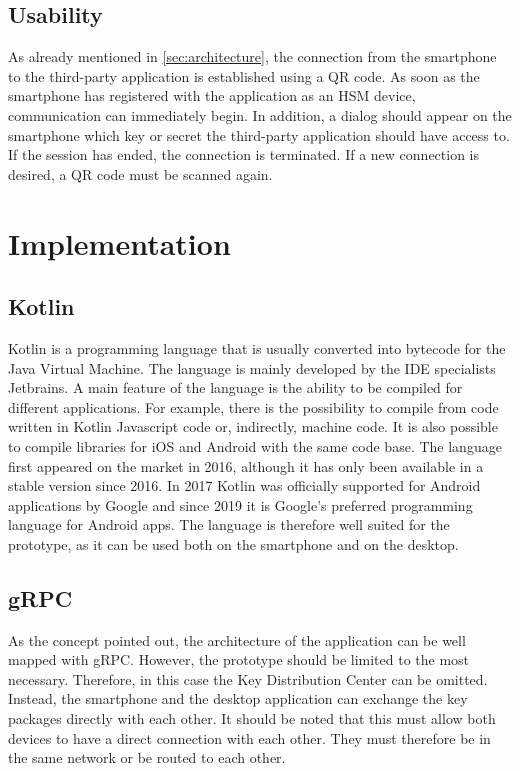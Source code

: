 \documentclass[12pt,oneside,a4paper,parskip]{scrbook}
\begin{document}
\section{Usability}
As already mentioned in \ref{sec:architecture}, the connection from the smartphone to the third-party application is established using a QR code. As soon as the smartphone has registered with the application as an HSM device, communication can immediately begin. In addition, a dialog should appear on the smartphone which key or secret the third-party application should have access to. If the session has ended, the connection is terminated. If a new connection is desired, a QR code must be scanned again.

\chapter{Implementation}

\section{Kotlin}
Kotlin is a programming language that is usually converted into bytecode for the Java Virtual Machine. The language is mainly developed by the IDE specialists Jetbrains. A main feature of the language is the ability to be compiled for different applications. For example, there is the possibility to compile from code written in Kotlin Javascript code or, indirectly, machine code. It is also possible to compile libraries for iOS and Android with the same code base. The language first appeared on the market in 2016, although it has only been available in a stable version since 2016. In 2017 Kotlin was officially supported for Android applications by Google and since 2019 it is Google's preferred programming language for Android apps. 
The language is therefore well suited for the prototype, as it can be used both on the smartphone and on the desktop. 

\section{gRPC}
As the concept pointed out, the architecture of the application can be well mapped with gRPC. However, the prototype should be limited to the most necessary. Therefore, in this case the Key Distribution Center can be omitted. Instead, the smartphone and the desktop application can exchange the key packages directly with each other. It should be noted that this must allow both devices to have a direct connection with each other. They must therefore be in the same network or be routed to each other. 
\end{document}
